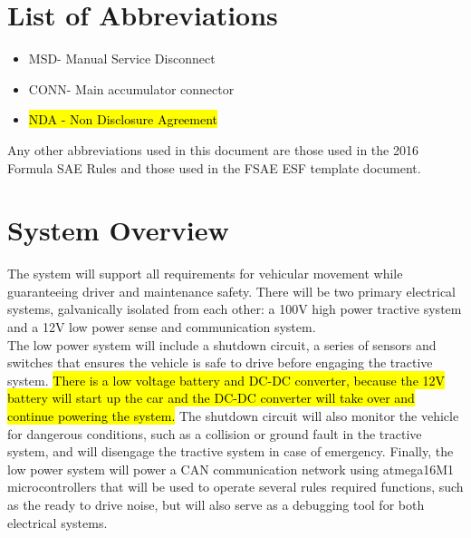 \documentclass{article}
\DeclareRobustCommand{\hlr}[1]{{\sethlcolor{red}\hl{#1}}}
\begin{document}
\tableofcontents
{}

\newpage
\listoffigures
{}

\newpage
\listoftables
{}

\newpage
\section*{List of Abbreviations}
\begin{itemize}
    \item MSD- Manual Service Disconnect
    \item CONN- Main accumulator connector
    \item \hlr{NDA - Non Disclosure Agreement}
\end{itemize}
    
    
    Any other abbreviations used in this document are those used in the 2016 Formula SAE Rules and those used in the FSAE ESF template document.

\setlength{\parindent}{0pt}

\newpage
{}


\section{System Overview} %

    The system will support all requirements for vehicular movement while guaranteeing driver and maintenance safety. There will be two primary electrical systems, galvanically isolated from each other: a 100V high power tractive system and a 12V low power sense and communication system.\\

    The low power system will include a shutdown circuit, a series of sensors and switches that ensures the vehicle is safe to drive before engaging the tractive system. \hlr{There is a low voltage battery and DC-DC converter, because the 12V battery will start up the car and the DC-DC converter will take over and continue powering the system.} The shutdown circuit will also monitor the vehicle for dangerous conditions, such as a collision or ground fault in the tractive system, and will disengage the tractive system in case of emergency. Finally, the low power system will power a CAN communication network using atmega16M1 microcontrollers that will be used to operate several rules required functions, such as the ready to drive noise, but will also serve as a debugging tool for both electrical systems.\\
\end{document}
